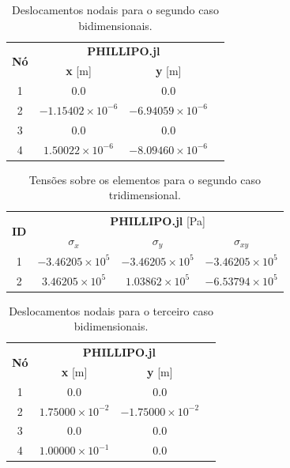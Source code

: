 \begin{table}
    \centering
    \caption{Deslocamentos nodais para o segundo caso bidimensionais.}
    \begin{tabular}{c | c c c }
        \toprule
        \multirow{2}{*}{\textbf{Nó}} & \multicolumn{2}{c}{\textbf{PHILLIPO.jl}}  \\
                                     & \textbf{x} [m] & \textbf{y} [m] \\                            
        \midrule
        1 & 0.0 & 0.0 \\
        2 & $-1.15402\times10^{-6}$ & $-6.94059\times10^{-6}$ \\
        3 & 0.0 & 0.0 \\
        4 & $1.50022\times10^{-6}$ & $-8.09460\times10^{-6}$ \\
        \bottomrule
    \end{tabular}
    \label{tab:verificacao_quadrado_2_deslocamentos}
\end{table}

\begin{table}
    \centering
    \caption{Tensões sobre os elementos para o segundo caso tridimensional.}
    \begin{tabular}{c | c c c}
        \toprule
        \multirow{2}{*}{\textbf{ID}} & \multicolumn{3}{c}{\textbf{PHILLIPO.jl} [Pa]}  \\
                                           & \textbf{$\sigma_x$} & \textbf{$\sigma_y$} & \textbf{$\sigma_{xy}$} \\                            
        \midrule
        1 & $-3.46205\times10^{5}$ & $-3.46205\times10^{5}$ & $-3.46205\times10^{5}$ \\
        2 & $3.46205\times10^{5}$ & $1.03862\times10^{5}$ & $-6.53794\times10^{5}$ \\
        \bottomrule
    \end{tabular}
    \label{tab:verificacao_quadrado_2_tensoes}
\end{table}


\begin{table}
    \centering
    \caption{Deslocamentos nodais para o terceiro caso bidimensionais.}
    \begin{tabular}{c | c c c }
        \toprule
        \multirow{2}{*}{\textbf{Nó}} & \multicolumn{2}{c}{\textbf{PHILLIPO.jl}}  \\
                                     & \textbf{x} [m] & \textbf{y} [m] \\                            
        \midrule
        1 & $0.0$ & $0.0$ \\
        2 & $1.75000\times10^{-2}$ & $-1.75000\times10^{-2}$ \\
        3 & $0.0$ & $0.0$ \\
        4 & $1.00000\times10^{-1}$ & $0.0$ \\
        \bottomrule
    \end{tabular}
    \label{tab:verificacao_quadrado_3_deslocamentos}
\end{table}

